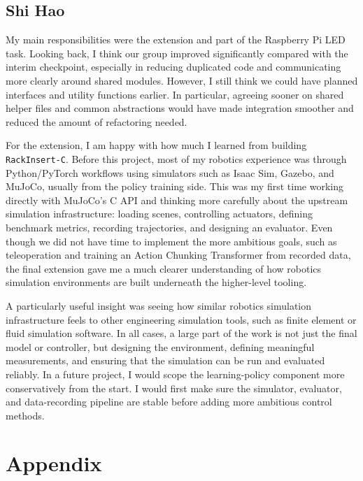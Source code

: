\documentclass[11pt]{article}
\begin{document}
\subsection{Shi Hao}
My main responsibilities were the extension and part of the Raspberry Pi LED task. Looking back, I think our group improved significantly compared with the interim checkpoint, especially in reducing duplicated code and communicating more clearly around shared modules. However, I still think we could have planned interfaces and utility functions earlier. In particular, agreeing sooner on shared helper files and common abstractions would have made integration smoother and reduced the amount of refactoring needed.

For the extension, I am happy with how much I learned from building \texttt{RackInsert-C}. Before this project, most of my robotics experience was through Python/PyTorch workflows using simulators such as Isaac Sim, Gazebo, and MuJoCo, usually from the policy training side. This was my first time working directly with MuJoCo's C API and thinking more carefully about the upstream simulation infrastructure: loading scenes, controlling actuators, defining benchmark metrics, recording trajectories, and designing an evaluator. Even though we did not have time to implement the more ambitious goals, such as teleoperation and training an Action Chunking Transformer from recorded data, the final extension gave me a much clearer understanding of how robotics simulation environments are built underneath the higher-level tooling.

A particularly useful insight was seeing how similar robotics simulation infrastructure feels to other engineering simulation tools, such as finite element or fluid simulation software. In all cases, a large part of the work is not just the final model or controller, but designing the environment, defining meaningful measurements, and ensuring that the simulation can be run and evaluated reliably. In a future project, I would scope the learning-policy component more conservatively from the start. I would first make sure the simulator, evaluator, and data-recording pipeline are stable before adding more ambitious control methods.

\section{Appendix}

\pagebreak
\end{document}

